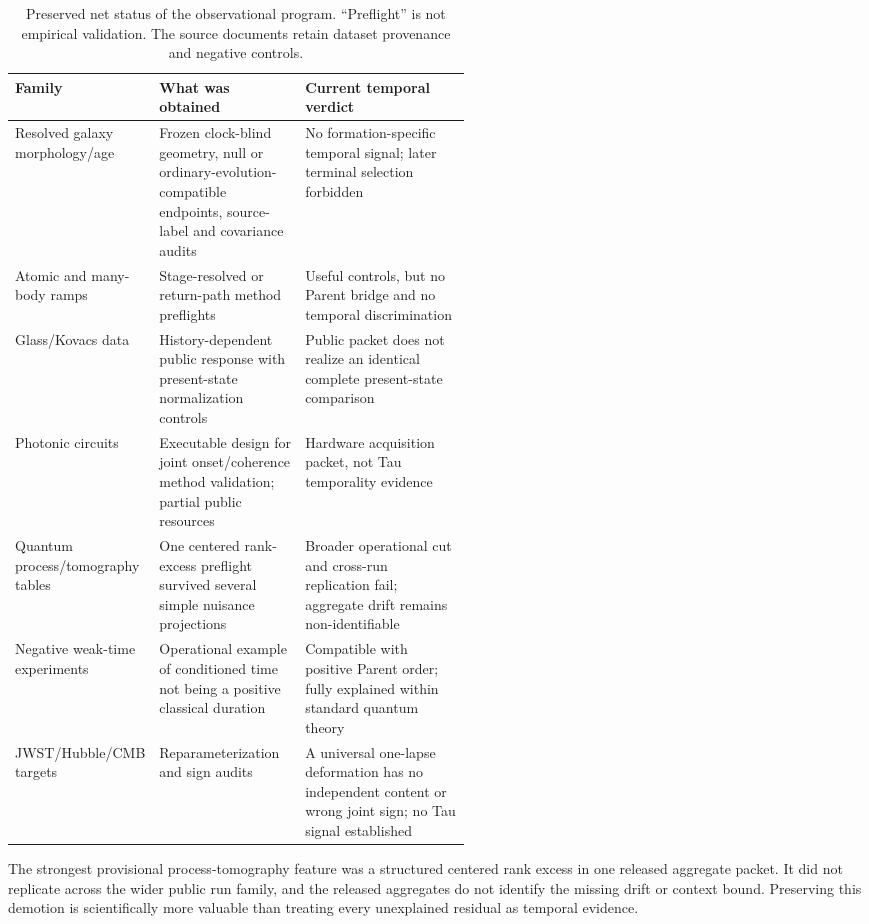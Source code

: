 \documentclass[11pt]{article}
\begin{document}
\begin{table}[t]
\centering
\small
\begin{tabularx}{\linewidth}{L{0.21\linewidth}L{0.32\linewidth}X}
\toprule
Family & What was obtained & Current temporal verdict \\
\midrule
Resolved galaxy morphology/age & Frozen clock-blind geometry, null or
ordinary-evolution-compatible endpoints, source-label and covariance audits &
No formation-specific temporal signal; later terminal selection forbidden \\
Atomic and many-body ramps & Stage-resolved or return-path method preflights &
Useful controls, but no Parent bridge and no temporal discrimination \\
Glass/Kovacs data & History-dependent public response with present-state
normalization controls & Public packet does not realize an identical complete
present-state comparison \\
Photonic circuits & Executable design for joint onset/coherence method
validation; partial public resources & Hardware acquisition packet, not Tau
temporality evidence \\
Quantum process/tomography tables & One centered rank-excess preflight survived
several simple nuisance projections & Broader operational cut and cross-run
replication fail; aggregate drift remains non-identifiable \\
Negative weak-time experiments & Operational example of conditioned time not
being a positive classical duration & Compatible with positive Parent order;
fully explained within standard quantum theory \\
JWST/Hubble/CMB targets & Reparameterization and sign audits & A universal
one-lapse deformation has no independent content or wrong joint sign; no Tau
signal established \\
\bottomrule
\end{tabularx}
\caption{Preserved net status of the observational program.  ``Preflight'' is
not empirical validation.  The source documents retain dataset provenance and
negative controls.}
\label{tab:data-status}
\end{table}

The strongest provisional process-tomography feature was a structured
centered rank excess in one released aggregate packet.  It did not replicate
across the wider public run family, and the released aggregates do not
identify the missing drift or context bound.  Preserving this demotion is
scientifically more valuable than treating every unexplained residual as
temporal evidence.
\end{document}
